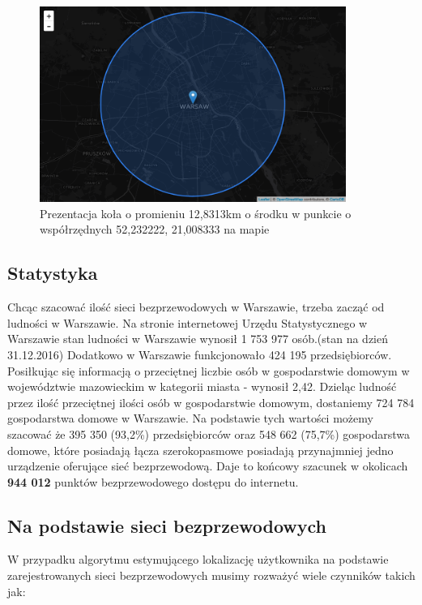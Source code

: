 \begin{figure}[h!]
  \centering
    \includegraphics[width=10cm]{images/warsaw-10km-radius}
  \caption{Prezentacja koła o promieniu 12,8313km o środku w punkcie o współrzędnych 52,232222, 21,008333 na mapie}
  \label{fig:warsaw10kmRadius}
\end{figure}

\subsection{Statystyka}
Chcąc szacować ilość sieci bezprzewodowych w Warszawie, trzeba zacząć od ludności w Warszawie. Na stronie internetowej Urzędu Statystycznego w Warszawie stan ludności w Warszawie wynosił 1 753 977 osób.(stan na dzień 31.12.2016) Dodatkowo w Warszawie funkcjonowało 424 195 przedsiębiorców. Posiłkując się informacją o przeciętnej liczbie osób w gospodarstwie domowym w województwie mazowieckim w kategorii miasta - wynosił 2,42.\cite{PrognozaGospodarstwGUS} Dzieląc ludność przez ilość przeciętnej ilości osób w gospodarstwie domowym, dostaniemy 724 784 gospodarstwa domowe w Warszawie. Na podstawie tych wartości możemy szacować że 395 350 (93,2\%)\cite{SpoleczenstoInformacyjneGUS} przedsiębiorców oraz 548 662 (75,7\%) gospodarstwa domowe, które posiadają łącza szerokopasmowe posiadają przynajmniej jedno urządzenie oferujące sieć bezprzewodową. Daje to końcowy szacunek w okolicach \textbf{944 012} punktów bezprzewodowego dostępu do internetu.

\subsection{Na podstawie sieci bezprzewodowych}
W przypadku algorytmu estymującego lokalizację użytkownika na podstawie zarejestrowanych sieci bezprzewodowych musimy rozważyć wiele czynników takich jak:

